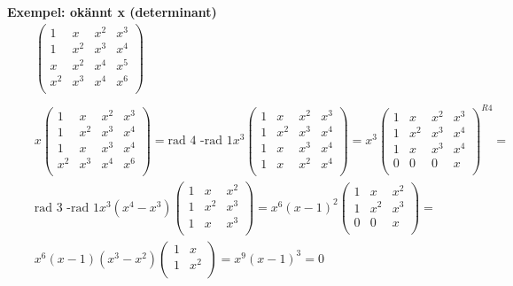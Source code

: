 \textbf{Exempel: okännt x (determinant)}
\begin{align*}
  &\quad  
  \left(\begin{array}{cccc}
    1   & x   & x^2 & x^3  \\
    1   & x^2 & x^3 & x^4  \\
    x   & x^2 & x^4 & x^5  \\
    x^2 & x^3 & x^4 & x^6  \\
  \end{array}\right) \\
  &\quad  \\
  &\quad  x
  \left(\begin{array}{cccc}
    1   & x   & x^2 & x^3  \\
    1   & x^2 & x^3 & x^4  \\
    1   & x   & x^3 & x^4  \\
    x^2 & x^3 & x^4 & x^6  \\
  \end{array}\right) = \text{rad 4 -rad 1} x^3  
  \left(\begin{array}{cccc}
    1   & x   & x^2 & x^3  \\
    1   & x^2 & x^3 & x^4  \\
    1   & x   & x^3 & x^4  \\
    1   & x   & x^2 & x^4  \\
  \end{array}\right) =  x^3
  \left(\begin{array}{cccc}
    1   & x   & x^2 & x^3  \\
    1   & x^2 & x^3 & x^4  \\
    1   & x   & x^3 & x^4  \\
    0   & 0   & 0 & x     \\
  \end{array}\right)^{R4} = \\
  &\quad  \text{rad 3 -rad 1} x^3(x^4-x^3)
  \left(\begin{array}{ccc}
    1   & x   & x^2  \\
    1   & x^2 & x^3  \\
    1   & x   & x^3  \\
  \end{array}\right) = x^6(x-1)^2
  \left(\begin{array}{ccc}
    1   & x   & x^2  \\
    1   & x^2 & x^3  \\
    0   & 0   & x  \\
  \end{array}\right) = \\
  &\quad x^6(x-1)(x^3-x^2)  
  \left(\begin{array}{cc}
    1   & x    \\
    1   & x^2  \\
  \end{array}\right) = x^9(x-1)^3=0
\end{align*}


